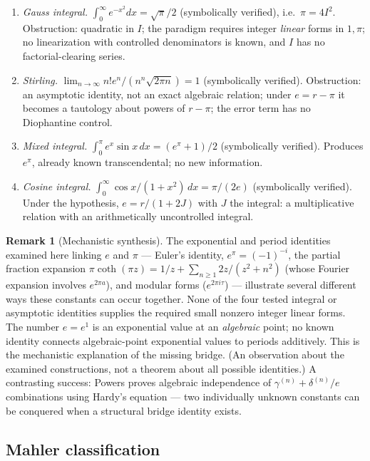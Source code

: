 \documentclass[11pt]{amsart}
\theoremstyle{definition}
\newtheorem{remark}[theorem]{Remark}
\theoremstyle{remark}
\numberwithin{equation}{section}
\newcommand{\ee}{e}
\begin{document}
\begin{enumerate}
\item \emph{Gauss integral.} $\int_0^\infty \ee^{-x^2}dx=\sqrt\pi/2$ (symbolically verified), i.e.\ $\pi=4I^2$. Obstruction: quadratic in $I$; the paradigm requires integer \emph{linear} forms in $1,\pi$; no linearization with controlled denominators is known, and $I$ has no factorial-clearing series.
\item \emph{Stirling.} $\lim_{n\to\infty}n!\ee^n/(n^n\sqrt{2\pi n})=1$ (symbolically verified). Obstruction: an asymptotic identity, not an exact algebraic relation; under $e=r-\pi$ it becomes a tautology about powers of $r-\pi$; the error term has no Diophantine control.
\item \emph{Mixed integral.} $\int_0^\pi \ee^x\sin x\,dx=(\ee^\pi+1)/2$ (symbolically verified). Produces $\ee^\pi$, already known transcendental; no new information.
\item \emph{Cosine integral.} $\int_0^\infty\cos x/(1+x^2)\,dx=\pi/(2\ee)$ (symbolically verified). Under the hypothesis, $\ee=r/(1+2J)$ with $J$ the integral: a multiplicative relation with an arithmetically uncontrolled integral.
\end{enumerate}

\begin{remark}[Mechanistic synthesis]
The exponential and period identities examined here linking $\ee$ and $\pi$ --- Euler's identity, $\ee^\pi=(-1)^{-i}$, the partial fraction expansion $\pi\coth(\pi z)=1/z+\sum_{n\ge1}2z/(z^2+n^2)$ (whose Fourier expansion involves $\ee^{2\pi a}$), and modular forms ($\ee^{2\pi i\tau}$) --- illustrate several different ways these constants can occur together. None of the four tested integral or asymptotic identities supplies the required small nonzero integer linear forms. The number $\ee=\ee^1$ is an exponential value at an \emph{algebraic} point; no known identity connects algebraic-point exponential values to periods additively. This is the mechanistic explanation of the missing bridge. (An observation about the examined constructions, not a theorem about all possible identities.) A contrasting success: Powers \cite{Powers2025} proves algebraic independence of $\gamma^{(n)}+\delta^{(n)}/\ee$ combinations using Hardy's equation --- two individually unknown constants can be conquered when a structural bridge identity exists.
\end{remark}

\subsection{Mahler classification}
\end{document}
